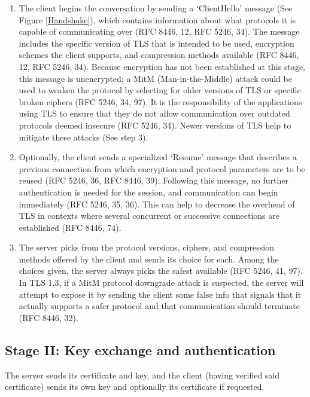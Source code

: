 \documentclass[12pt]{article}
\begin{document}
\begin{enumerate}[rightmargin=1cm]
    \item The client begins the conversation by sending a ‘ClientHello’ message (See Figure \ref{Handshake}), which contains information about what protocols it is capable of communicating over (RFC 8446, 12, RFC 5246, 34). The message includes the specific version of TLS that is intended to be used, encryption schemes the client supports, and compression methods available (RFC 8446, 12, RFC 5246, 34). Because encryption has not been established at this stage, this message is unencrypted; a MitM (Man-in-the-Middle) attack could be used to weaken the protocol by selecting for older versions of TLS or specific broken ciphers (RFC 5246, 34, 97). It is the responsibility of the applications using TLS to ensure that they do not allow communication over outdated protocols deemed insecure (RFC 5246, 34). Newer versions of TLS help to mitigate these attacks (See step 3).
    \item Optionally, the client sends a specialized ‘Resume’ message that describes a previous connection from which encryption and protocol parameters are to be reused (RFC 5246, 36, RFC 8446, 39). Following this message, no further authentication is needed for the session, and communication can begin immediately (RFC 5246, 35, 36). This can help to decrease the overhead of TLS in contexts where several concurrent or successive connections are established (RFC 8446, 74).
    \item The server picks from the protocol versions, ciphers, and compression methods offered by the client and sends its choice for each. Among the choices given, the server always picks the safest available (RFC 5246, 41, 97). In TLS 1.3, if a MitM protocol downgrade attack is suspected, the server will attempt to expose it by sending the client some false info that signals that it actually supports a safer protocol and that communication should terminate (RFC 8446, 32). 
\end{enumerate}

\subsection{Stage II: Key exchange and authentication}
The server sends its certificate and key, and the client (having verified said certificate) sends its own key and optionally its certificate if requested.
\end{document}
